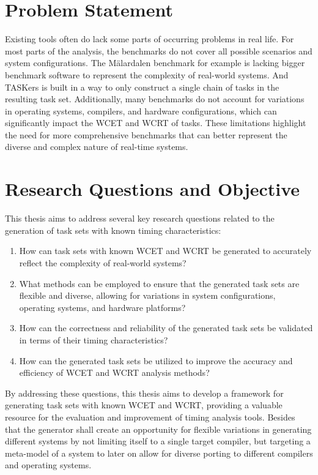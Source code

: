 \section{Problem Statement}\label{sec:problem_statement}
Existing tools often do lack some parts of occurring problems in real life.
For most parts of the analysis, the benchmarks do not cover all possible scenarios and system configurations.
The Mälardalen benchmark\cite{gustafssonMalardalenWCETBenchmarks2012} for example is lacking bigger benchmark software to represent the complexity of real-world systems.
And TASKers\cite{eichler_taskers_2018} is built in a way to only construct a single chain of tasks in the resulting task set.
Additionally, many benchmarks do not account for variations in operating systems, compilers\cite{gustafssonMalardalenWCETBenchmarks2012}, and hardware configurations, which can significantly impact the \ac{WCET} and \ac{WCRT} of tasks.
These limitations highlight the need for more comprehensive benchmarks that can better represent the diverse and complex nature of real-time systems.

\section{Research Questions and Objective}\label{sec:research_questions_objectives}
This thesis aims to address several key research questions related to the generation of task sets with known timing characteristics:

\begin{enumerate}
	\item How can task sets with known \ac{WCET} and \ac{WCRT} be generated to accurately reflect the complexity of real-world systems?
	\item What methods can be employed to ensure that the generated task sets are flexible and diverse, allowing for variations in system configurations, operating systems, and hardware platforms?
	\item How can the correctness and reliability of the generated task sets be validated in terms of their timing characteristics?
	\item How can the generated task sets be utilized to improve the accuracy and efficiency of \ac{WCET} and \ac{WCRT} analysis methods?
\end{enumerate}

By addressing these questions, this thesis aims to develop a framework for generating task sets with known \ac{WCET} and \ac{WCRT}, providing a valuable resource for the evaluation and improvement of timing analysis tools.
Besides that the generator shall create an opportunity for flexible variations in generating different systems by not limiting itself to a single target compiler, but targeting a meta-model of a system to later on allow for diverse porting to different compilers and operating systems.


